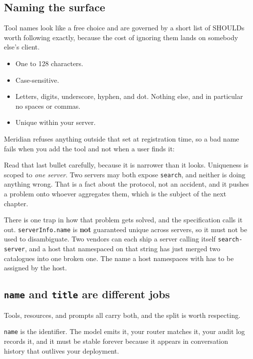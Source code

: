 \subsection{Naming the surface}

Tool names look like a free choice and are governed by a short list of SHOULDs
worth following exactly, because the cost of ignoring them lands on somebody else's client.

\begin{itemize}[leftmargin=1.6em, itemsep=2pt]
\item One to 128 characters.
\item Case-sensitive.
\item Letters, digits, underscore, hyphen, and dot. Nothing else, and in
particular no spaces or commas.
\item Unique within your server.
\end{itemize}

Meridian refuses anything outside that set at registration time, so a bad name
fails when you add the tool and not when a user finds it:


Read that last bullet carefully, because it is narrower than it looks.
Uniqueness is scoped to \emph{one server}. Two servers may both expose
\texttt{search}, and neither is doing anything wrong. That is a fact about the
protocol, not an accident, and it pushes a problem onto whoever aggregates
them, which is the subject of the next chapter.

There is one trap in how that problem gets solved, and the specification calls
it out. \texttt{serverInfo.name} is \textbf{not} guaranteed unique across
servers, so it must not be used to disambiguate. Two vendors can each ship a
server calling itself \texttt{search-server}, and a host that namespaced on
that string has just merged two catalogues into one broken one. The name a host
namespaces with has to be assigned by the host.

\subsection{\texttt{name} and \texttt{title} are different jobs}

Tools, resources, and prompts all carry both, and the split is worth respecting.

\texttt{name} is the identifier. The model emits it, your router matches it,
your audit log records it, and it must be stable forever because it appears in
conversation history that outlives your deployment.

